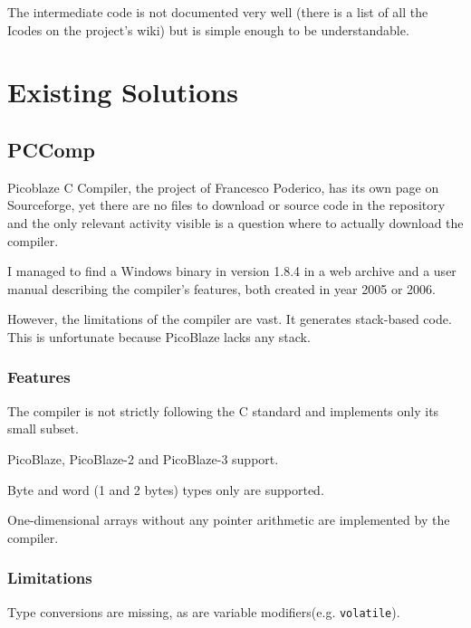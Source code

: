     The intermediate code is not documented very well (there is a list of all the Icodes on the project's wiki) but is simple enough to be understandable.


\chapter{Existing Solutions}\label{existing}

    \section{PCComp}\label{pccomp}

    Picoblaze C Compiler, the project of Francesco Poderico, has its own page on Sourceforge, 
    yet there are no files to download or source code in the repository and the only relevant activity visible is a question where to actually download the compiler.

    I managed to find a Windows binary in version 1.8.4 in a web archive and a user manual describing the compiler's features, both created in year 2005 or 2006.

    However, the limitations of the compiler are vast. It generates stack-based code. This is unfortunate because PicoBlaze lacks any stack. 

        \subsection{Features}

        The compiler is not strictly following the C standard and implements only its small subset.

        PicoBlaze, PicoBlaze-2 and PicoBlaze-3 support.

        Byte and word (1 and 2 bytes) types only are supported.

        One-dimensional arrays without any pointer arithmetic are implemented by the compiler.

        \subsection{Limitations}

        Type conversions are missing, as are variable modifiers(e.g. \texttt{volatile}). 

